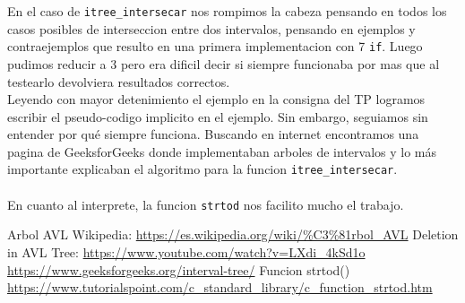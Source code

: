 \documentclass{article}
\begin{document}
	En el caso de \verb|itree_intersecar| nos rompimos la cabeza pensando en todos los casos posibles de interseccion entre dos intervalos, pensando en ejemplos y contraejemplos que resulto en una primera implementacion con 7 \verb|if|. Luego pudimos reducir a 3 pero era dificil decir si siempre funcionaba por mas que al testearlo devolviera resultados correctos.\\
	Leyendo con mayor detenimiento el ejemplo en la consigna del TP logramos escribir el pseudo-codigo implicito en el ejemplo. Sin embargo, seguiamos sin entender por qué siempre funciona. Buscando en internet encontramos una pagina de GeeksforGeeks donde implementaban arboles de intervalos y lo más importante explicaban el algoritmo para la funcion \verb|itree_intersecar|.\\\\
	En cuanto al interprete, la funcion \verb|strtod| nos facilito mucho el trabajo.
	\begin{thebibliography}{4}
		\bibitem {}
			Arbol AVL Wikipedia:
			\url {https://es.wikipedia.org/wiki/%C3%81rbol_AVL}
		\bibitem {}
			Deletion in AVL Tree:
			\url {https://www.youtube.com/watch?v=LXdi_4kSd1o}
		\bibitem {}
			\url {https://www.geeksforgeeks.org/interval-tree/}
		\bibitem {}
			Funcion strtod()
			\url {https://www.tutorialspoint.com/c_standard_library/c_function_strtod.htm}
	\end{thebibliography}
\end{document}
